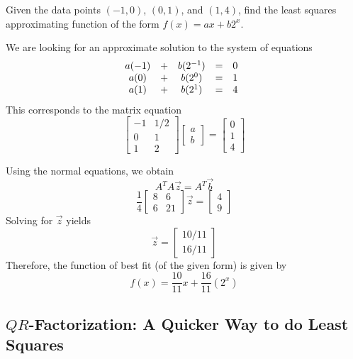 \documentclass{ximera}
\begin{document}
 \begin{example}\label{ex:leastSq3}
     Given the data points $(-1, 0)$, $(0,1)$, and $(1,4)$, find the least squares approximating function of the form $f(x)=ax+b2^x$.
\begin{explanation}
    We are looking for an approximate solution to the system of equations
    $$\begin{matrix}a(-1)&+&b(2^{-1})&=&0\\a(0)&+&b(2^{0})&=&1\\a(1)&+&b(2^{1})&=&4\end{matrix}\\$$
    This corresponds to the matrix equation
    $$\begin{bmatrix}-1&1/2\\0&1\\1&2\end{bmatrix}\begin{bmatrix}a\\b\end{bmatrix}=\begin{bmatrix}0\\1\\4\end{bmatrix}$$

    Using the normal equations, we obtain
    $$A^TA\vec{z}=A^T\vec{b}$$
    $$\frac{1}{4}\begin{bmatrix}8&6\\6&21\end{bmatrix}\vec{z}=\begin{bmatrix}4\\9\end{bmatrix}$$
Solving for $\vec{z}$ yields
$$\vec{z}=\begin{bmatrix}10/11\\16/11\end{bmatrix}$$
Therefore, the function of best fit (of the given form) is given by $$f(x)=\frac{10}{11}x+\frac{16}{11}(2^x)$$

\begin{onlineOnly}
\begin{center}
\end{center}
\end{onlineOnly}
\end{explanation}
 \end{example}

\subsection*{$QR$-Factorization: A Quicker Way to do Least Squares}
\end{document}
